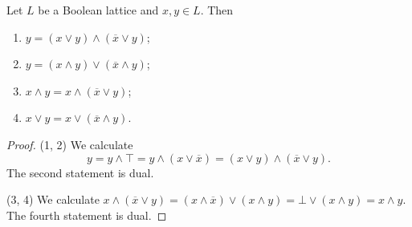 \begin{lemma} \label{BooleanLatticesLemma}
Let $L$ be a Boolean lattice and $x,y\in L$. Then
\begin{enumerate}
\item $y = (x\vee y) \wedge (\overline{x}\vee y)$;
\item $y = (x\wedge y) \vee (\overline{x}\wedge y)$;
\item $x \wedge y = x\wedge (\overline{x}\vee y)$;
\item $x \vee y = x\vee (\overline{x}\wedge y)$.
\end{enumerate}
\end{lemma}
\begin{proof}
(1, 2) We calculate
\[ y = y \wedge \top = y \wedge (x\vee \overline{x}) = (x\vee y) \wedge (\overline{x}\vee y). \]
The second statement is dual.

(3, 4) We calculate $x\wedge (\overline{x}\vee y) = (x\wedge \overline{x})\vee (x\wedge y) = \bot \vee (x\wedge y) = x\wedge y$. The fourth statement is dual.
\end{proof}

